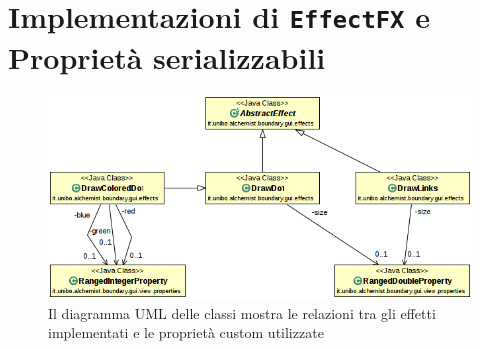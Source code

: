     \section{Implementazioni di \texttt{EffectFX} e Proprietà serializzabili}\label{appendix:effectsAndProps}
        \begin{figure}[htbp]
          \centering
          \includegraphics[scale=0.7]{img/EffectAndPropertiesUML}
          \caption{Il diagramma UML delle classi mostra le relazioni tra gli effetti implementati e le proprietà custom utilizzate}
        \end{figure}
